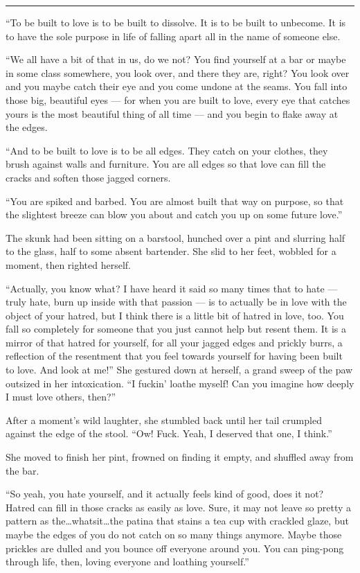 \begin{center}\rule{0.5\linewidth}{0.5pt}\end{center}

``To be built to love is to be built to dissolve. It is to be built to unbecome. It is to have the sole purpose in life of falling apart all in the name of someone else.

``We all have a bit of that in us, do we not? You find yourself at a bar or maybe in some class somewhere, you look over, and there they are, right? You look over and you maybe catch their eye and you come undone at the seams. You fall into those big, beautiful eyes — for when you are built to love, every eye that catches yours is the most beautiful thing of all time — and you begin to flake away at the edges.

``And to be built to love is to be all edges. They catch on your clothes, they brush against walls and furniture. You are all edges so that love can fill the cracks and soften those jagged corners.

``You are spiked and barbed. You are almost built that way on purpose, so that the slightest breeze can blow you about and catch you up on some future love.''

The skunk had been sitting on a barstool, hunched over a pint and slurring half to the glass, half to some absent bartender. She slid to her feet, wobbled for a moment, then righted herself.

``Actually, you know what? I have heard it said so many times that to hate — truly hate, burn up inside with that passion — is to actually be in love with the object of your hatred, but I think there is a little bit of hatred in love, too. You fall so completely for someone that you just cannot help but resent them. It is a mirror of that hatred for yourself, for all your jagged edges and prickly burrs, a reflection of the resentment that you feel towards yourself for having been built to love. And look at me!'' She gestured down at herself, a grand sweep of the paw outsized in her intoxication. ``I fuckin' loathe myself! Can you imagine how deeply I must love others, then?''

After a moment's wild laughter, she stumbled back until her tail crumpled against the edge of the stool. ``Ow! Fuck. Yeah, I deserved that one, I think.''

She moved to finish her pint, frowned on finding it empty, and shuffled away from the bar.

``So yeah, you hate yourself, and it actually feels kind of good, does it not? Hatred can fill in those cracks as easily as love. Sure, it may not leave so pretty a pattern as the\ldots whatsit\ldots the patina that stains a tea cup with crackled glaze, but maybe the edges of you do not catch on so many things anymore. Maybe those prickles are dulled and you bounce off everyone around you. You can ping-pong through life, then, loving everyone and loathing yourself.''

